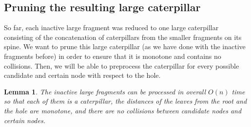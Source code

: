 \documentclass[11pt,a4paper]{article}
\newtheorem{lemma}{Lemma}
\theoremstyle{definition}
\theoremstyle{remark}
\begin{document}
\subsection{Pruning the resulting large caterpillar}\label{section:lemma3}
So far, each inactive large fragment was reduced to one large caterpillar consisting of the concatenation of caterpillars from the smaller fragments on its spine. We want
to prune this large caterpillar (as we have done with the inactive fragments before) in order to ensure
that it is monotone and contains no collisions.   Then, we will
be able to preprocess the caterpillar for every possible candidate and certain node with respect to the hole.

\begin{lemma}\label{lemma3}
	The inactive large fragments can be processed in overall $O(n)$ time so that each of them is a caterpillar, the distances of the leaves from the root and the hole are monotone, and there are no collisions between candidate nodes and certain nodes.
\end{lemma}
\end{document}
